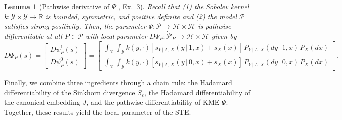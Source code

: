 \documentclass{article}
\theoremstyle{plain}
\newtheorem{lemma}[theorem]{Lemma}
\theoremstyle{definition}
\theoremstyle{remark}
\newcommand{\R}{\mathbb{R}}
\newcommand{\off}[1]{\left[#1\right]}
\newcommand{\cH}{\mathcal{H}}
\newcommand{\cP}{\mathcal{P}}
\newcommand{\cY}{\mathcal{Y}}
\newcommand{\cX}{\mathcal{X}}
\newcommand{\1}{\mathbbm{1}}
\newcommand{\eps}{\varepsilon}
\theoremstyle{plain}
\theoremstyle{definition}
\newcommand{\mymid}{\,|\,}
\begin{document}
\begin{lemma}[Pathwise derivative of $\Psi$ \citealp{luedtke2024one}, Ex.~3]\label{lem:KME_pathwise_derivative}
    Recall that (1) the Sobolev kernel $k:\cY \times \cY \to \R$ is bounded, symmetric, and positive definite and (2) the model $\cP$ satisfies strong positivity. Then, the parameter $\Psi: \cP \to \cH \times \cH$ is pathwise differentiable at all $P \in \cP$ with local parameter $D\Psi_P: \dot{\cP}_P \to \cH \times \cH$ given by
    \begin{equation}\label{eq:KME_pathwise_derivative}
        D\Psi_P(s) = \begin{bmatrix}
        D{\psi}^1_P(s)\\
        D{\psi}^0_P(s)
    \end{bmatrix} = \begin{bmatrix}
        \int_\cX \int_\cY k(y, \cdot) \off{s_{Y \mymid A, X}(y \mymid 1, x) + s_X(x)} \, P_{Y \mymid A, X}(dy \mymid 1, x) \,P_X(dx)\\
        \int_\cX \int_\cY k(y, \cdot) \off{s_{Y \mymid A, X}(y \mymid 0, x) + s_X(x)} \,P_{Y \mymid A, X}(dy \mymid 0, x) \,P_X(dx)
    \end{bmatrix}.
    \end{equation}
\end{lemma}

Finally, we combine three ingredients through a chain rule: the Hadamard differentiability of the Sinkhorn divergence $S_\eps$, the Hadamard differentiability of the canonical embedding $J$, and the pathwise differentiability of KME 
$\Psi$. Together, these results yield the local parameter of the STE.
\end{document}
